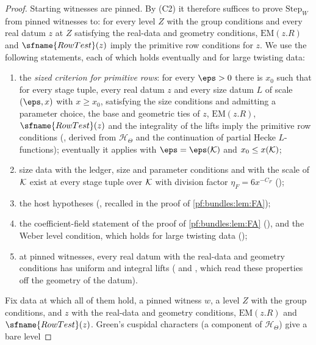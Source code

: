 \begin{proof}
Starting witnesses are pinned. By (C2) it therefore suffices to prove $\mathrm{Step}_W$ from pinned witnesses to: for every level $Z$ with the
group conditions and every real datum $z$ at $Z$ satisfying the real-data and geometry conditions, $\mathrm{EM}(z.R)$ and $\sfname{RowTest}(z)$
imply the primitive row conditions for $z$. We use the following statements, each of which holds eventually and for large twisting data:
\begin{enumerate}[label=(\roman*)]
\item the \emph{sized criterion for primitive rows}: for every $\eps>0$ there is $x_0$ such that for every stage tuple, every real datum $z$
and every size datum $L$ of scale $(\eps,x)$ with $x\ge x_0$, satisfying the size conditions and admitting a parameter choice, the base and
geometric ties of $z$, $\mathrm{EM}(z.R)$, $\sfname{RowTest}(z)$ and the integrality of the lifts imply the primitive row conditions
(, derived from $\mathcal H_\Theta$ and the continuation of partial Hecke
$L$-functions); eventually it applies with $\eps=\eps(\bundK)$ and $x_0\le x(\mathcal K)$;
\item size data with the ledger, size and parameter conditions and with the scale of $\mathcal K$ exist at every stage tuple over $\mathcal K$ with
division factor $\eta_F=6x^{-C_F}$ ();
\item the host hypotheses (, recalled in the proof of \cref{pf:bundles:lem:FA});
\item the coefficient-field statement of the proof of \cref{pf:bundles:lem:FA}
(), and the Weber level condition, which holds for large twisting data
();
\item at pinned witnesses, every real datum with the real-data and geometry conditions has uniform and integral lifts
( and , which read these properties off the
geometry of the datum).
\end{enumerate}
Fix data at which all of them hold, a pinned witness $w$, a level $Z$ with the group conditions, and $z$ with the real-data and geometry
conditions, $\mathrm{EM}(z.R)$ and $\sfname{RowTest}(z)$. Green's cuspidal characters (a component of $\mathcal H_\Theta$) give a bare level

\end{proof}
